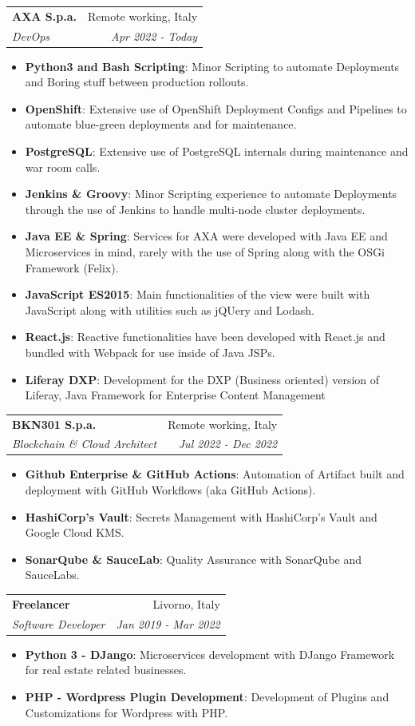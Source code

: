 \documentclass[letterpaper,11pt]{article}
\makeatletter
\newcommand{\resumeItem}[2]{
  \item\small{
    \textbf{#1}{: #2 \vspace{-2pt}}
  }
}
\newcommand{\resumeSubheading}[4]{
  \vspace{-1pt}\item
    \begin{tabular*}{0.97\textwidth}[t]{l@{\extracolsep{\fill}}r}
      \textbf{#1} & #2 \\
      \textit{\small#3} & \textit{\small #4} \\
    \end{tabular*}\vspace{-5pt}
}
\newcommand{\resumeSubSubheading}[2]{
    \begin{tabular*}{0.97\textwidth}{l@{\extracolsep{\fill}}r}
      \textit{\small#1} & \textit{\small #2} \\
    \end{tabular*}\vspace{-5pt}
}
\newcommand{\resumeSubHeadingListEnd}{\end{itemize}}
\newcommand{\resumeItemListStart}{\begin{itemize}}
\newcommand{\resumeItemListEnd}{\end{itemize}\vspace{-5pt}}
\makeatother
\begin{document}

    \resumeSubheading
      {AXA S.p.a.}{Remote working, Italy}
      {DevOps}{Apr 2022 - Today}
      \resumeItemListStart
      	\resumeItem{Python3 and Bash Scripting}
          {Minor Scripting to automate Deployments and Boring stuff between production rollouts.}
        \resumeItem{OpenShift}
          {Extensive use of OpenShift Deployment Configs and Pipelines to automate blue-green deployments and for maintenance.}
        \resumeItem{PostgreSQL}
          {Extensive use of PostgreSQL internals during maintenance and war room calls.}
        \resumeItem{Jenkins \& Groovy}
          {Minor Scripting experience to automate Deployments through the use of Jenkins to handle multi-node cluster deployments.}
        \resumeItem{Java EE \& Spring}
          {Services for AXA were developed with Java EE and Microservices in mind, rarely with the use of Spring along with the OSGi Framework (Felix).}
        \resumeItem{JavaScript ES2015}
          {Main functionalities of the view were built with JavaScript along with utilities such as jQUery and Lodash.}
        \resumeItem{React.js}
          {Reactive functionalities have been developed with React.js and bundled with Webpack for use inside of Java JSPs.}
        \resumeItem{Liferay DXP}
          {Development for the DXP (Business oriented) version of Liferay, Java Framework for Enterprise Content Management}
      \resumeItemListEnd

    \resumeSubheading
      {BKN301 S.p.a.}{Remote working, Italy}
      {Blockchain \& Cloud Architect}{Jul 2022 - Dec 2022}
      \resumeItemListStart
        \resumeItem{Github Enterprise \& GitHub Actions}
          {Automation of Artifact built and deployment with GitHub Workflows (aka GitHub Actions).}
        \resumeItem{HashiCorp's Vault}
          {Secrets Management with HashiCorp's Vault and Google Cloud KMS.}
          \resumeItem{SonarQube \& SauceLab}
          {Quality Assurance with SonarQube and SauceLabs.}
      \resumeItemListEnd

    \resumeSubheading
      {Freelancer}{Livorno, Italy}
      {Software Developer}{Jan 2019 - Mar 2022}
      \resumeItemListStart
        \resumeItem{Python 3 - DJango}
          {Microservices development with DJango Framework for real estate related businesses.}
        \resumeItem{PHP - Wordpress Plugin Development}
          {Development of Plugins and Customizations for Wordpress with PHP.}
      \resumeItemListEnd
\end{document}
